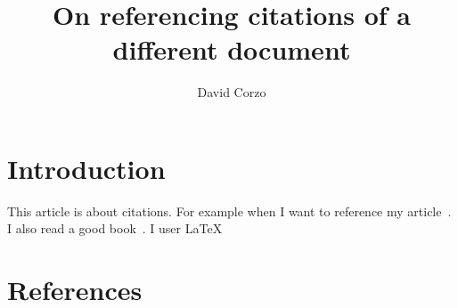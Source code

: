 \documentclass{article}
\title{On referencing citations of a different document}
\author{David Corzo}
\date{}
\begin{document}
\maketitle

\section{Introduction}

This article is about citations. For example when I want to reference my article~\cite{smith2012}. I also read a good book~\cite{hall2013}. I user \LaTeX~\cite{latex}

\section{References}



 
\end{document}
